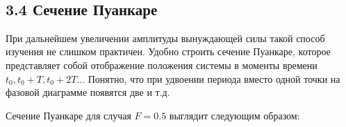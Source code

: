 \documentclass[11pt]{article}
\begin{document}
    \begin{center}
    \end{center}
    { \hspace*{\fill} \\}
    
    \hypertarget{ux441ux435ux447ux435ux43dux438ux435-ux43fux443ux430ux43dux43aux430ux440ux435}{%
\subsection{3.4 Сечение
Пуанкаре}\label{ux441ux435ux447ux435ux43dux438ux435-ux43fux443ux430ux43dux43aux430ux440ux435}}

При дальнейшем увеличении амплитуды вынуждающей силы такой способ
изучения не слишком практичен. Удобно строить сечение Пуанкаре, которое
представляет собой отображение положения системы в моменты времени
\(t_0, t_0+T, t_0 + 2T...\) Понятно, что при удвоении периода вместо
одной точки на фазовой диаграмме появятся две и т.д.

Сечение Пуанкаре для случая \(F = 0.5\) выглядит следующим образом:
\end{document}
